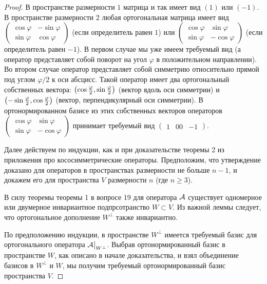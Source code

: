 \begin{proof}
    В пространстве размерности $1$ матрица и так имеет вид $(1)$ или $(-1)$. В пространстве размерности $2$ любая ортогональная матрица имеет вид
    $
    \begin{pmatrix}
        \cos\varphi & -\sin\varphi\\
        \sin\varphi & \cos\varphi
    \end{pmatrix}
    $ (если определитель равен $1$) или
    $
    \begin{pmatrix}
        \cos\varphi & \sin\varphi\\
        \sin\varphi & -\cos\varphi
    \end{pmatrix}
    $ (если определитель равен $-1$). В первом случае мы уже имеем требуемый вид (а оператор представляет собой поворот на угол $\varphi$ в положительном направлении). Во втором случае оператор представляет собой симметрию относительно прямой под углом $\varphi / 2$ к оси абсцисс. Такой оператор имеет два ортогональный собственных вектора: $\left(\cos\frac{\varphi}{2}, \sin\frac{\varphi}{2}\right)$ (вектор вдоль оси симметрии) и $\left(-\sin\frac{\varphi}{2}, \cos\frac{\varphi}{2}\right)$ (вектор, перпендикулярный оси симметрии). В ортонормированном базисе из этих собственных векторов операторов
    $
    \begin{pmatrix}
        \cos\varphi & \sin\varphi\\
        \sin\varphi & -\cos\varphi
    \end{pmatrix}
    $ принимает требуемый вид
    $
    \begin{pmatrix}
        1 & 0
        0 & -1
    \end{pmatrix}
    $.

    Далее действуем по индукции, как и при доказательстве теоремы 2 из приложения про кососимметрические операторы. Предположим, что утверждение доказано для операторов в пространствах размерности не больше $n - 1$, и докажем его для пространства $V$ размерности $n$ (где $n \geqslant 3$).

    В силу теоремы теоремы 1 в вопросе 19 для оператора $\mathcal{A}$ существует одномерное или двумерное инвариантное подпрсотранство $W \subset V$. Из важной леммы следует, что ортогональное дополнение $W^\perp$ также инвариантно.

    По предположению индукции, в пространстве $W^\perp$ имеется требуемый базис для ортогонального оператора $\mathcal{A}\big|_{W^\perp}$. Выбрав ортонормированный базис в пространстве $W$, как описано в начале доказательства, и взял объединение базисов в $W^\perp$ и $W$, мы получим требуемый ортонормированный базис пространства $V$.
\end{proof}


